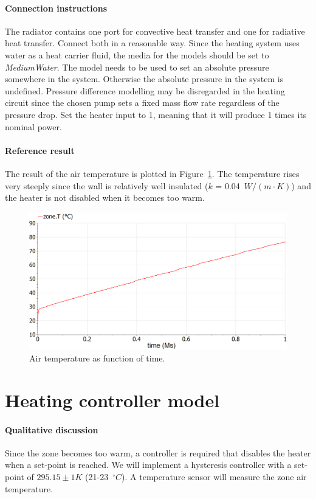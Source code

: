 \documentclass[10pt,a4paper]{article}
\begin{document}
\paragraph{Connection instructions}
The radiator contains one port for convective heat transfer and one for radiative heat transfer. Connect both in a reasonable way. Since the heating system uses water as a heat carrier fluid, the media for the models should be set to \textit{MediumWater}. The  model needs to be used to set an absolute pressure somewhere in the system. Otherwise the absolute pressure in the system is undefined. Pressure difference modelling may be disregarded in the heating circuit since the chosen pump sets a fixed mass flow rate regardless of the pressure drop. Set the heater input to 1, meaning that it will produce 1 times its nominal power.

\paragraph{Reference result}
The result of the air temperature is plotted in Figure~\ref{fig:res4}. The temperature rises very steeply since the wall is relatively well insulated ($k$ = 0.04~$W/(m\cdot K)$) and the heater is not disabled when it becomes too warm.
\begin{figure}[h]
\centering
\includegraphics[width=0.6\columnwidth]{img/result4.png}
\caption{Air temperature as function of time.}
\label{fig:res4}
\end{figure}


\newpage
\section{Heating controller model}
\paragraph{Qualitative discussion}
Since the zone becomes too warm, a controller is required that disables the heater when a set-point is reached. We will implement a hysteresis controller with a set-point of $295.15 \pm 1 K$ (21-23~$^{\circ}C$). A temperature sensor will measure the zone air temperature.
\end{document}
